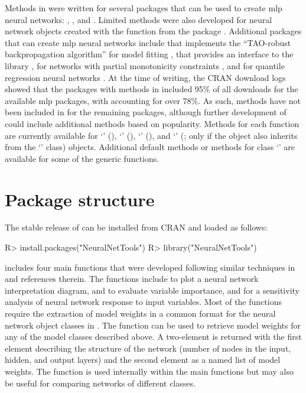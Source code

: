 \documentclass[article]{jss}
\begin{document}
Methods in  were written for several 
packages that can be used to create \ac{mlp} neural networks:
 \citep{Fritsch12},  \citep{Venables02}, and
 \citep{Bergmeir12}. Limited methods were also developed
for neural network objects created with the  function from
the  package \citep{Kuhn15}.  Additional 
packages that can create \ac{mlp} neural networks include 
that implements the ``TAO-robust backpropagation algorithm'' for model
fitting \citep{Castejon14},  that provides an 
interface to the   library \citep{Klima15},
 for networks with partial monotonicity constraints
\citep{Cannon15}, and  for quantile regression neural
networks \citep{Cannon11}.  At the time of writing, the \ac{CRAN}
download logs \citep{Csardi15} showed that the  packages
with methods in  included 95\% of all downloads
for the available \ac{mlp} packages, with  accounting for
over 78\%.  As such, methods have not been included in
 for the remaining packages, although further
development of  could include additional methods
based on popularity.  Methods for each function are currently
available for `' (), `'
(), `' (), and `'
(; only if the object also inherits from the `'
class) objects.  Additional default methods or methods for class
`' are available for some of the generic functions.

\section[Package structure]{Package structure}

The stable release of  can be installed from \ac{CRAN} and loaded as follows:
%
\begin{Schunk}
\begin{Sinput}
R> install.packages("NeuralNetTools")
R> library("NeuralNetTools")
\end{Sinput}
\end{Schunk}
%
 includes four main functions that were developed
following similar techniques in \citet{Olden02} and references
therein.  The functions include  to plot a neural
network interpretation diagram,  and  to
evaluate variable importance, and  for a sensitivity
analysis of neural network response to input variables.  Most of the
functions require the extraction of model weights in a common format
for the neural network object classes in .  The
 function can be used to retrieve model weights
for any of the model classes described above.  A two-element
 is returned with the first element describing the
structure of the network (number of nodes in the input, hidden, and
output layers) and the second element as a named list of model
weights.  The function is used internally within the main functions
but may also be useful for comparing networks of different classes.
\end{document}

